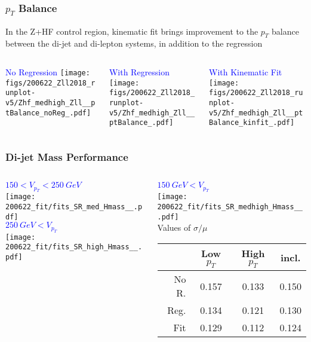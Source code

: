 \documentclass{beamer}
\begin{document}
\begin{frame}
  \frametitle{$p_T$ Balance}

  In the Z+HF control region, kinematic fit brings improvement to the $p_T$ balance
  between the di-jet and di-lepton systems,
  in addition to the regression
  \vfill

  \begin{columns}
    \begin{column}{0.33\linewidth}
      \centering
      \textcolor{blue}{No Regression}
      \texttt{[image: figs/200622\_Zll2018\_runplot-v5/Zhf\_medhigh\_Zll\_\_ptBalance\_noReg\_.pdf]}
    \end{column}
    \begin{column}{0.34\linewidth}
      \centering
      \textcolor{blue}{With Regression}
      \texttt{[image: figs/200622\_Zll2018\_runplot-v5/Zhf\_medhigh\_Zll\_\_ptBalance\_.pdf]}
    \end{column}
    \begin{column}{0.33\linewidth}
      \centering
      \textcolor{blue}{With Kinematic Fit}
      \texttt{[image: figs/200622\_Zll2018\_runplot-v5/Zhf\_medhigh\_Zll\_\_ptBalance\_kinfit\_.pdf]}
    \end{column}
  \end{columns}

\end{frame}

\begin{frame}
  \frametitle{Di-jet Mass Performance}

  \begin{columns}
    \begin{column}{0.5\linewidth}
      \centering
      \textcolor{blue}{$150 < V_{p_T} < \SI{250}{GeV}$} \\
      \texttt{[image: 200622\_fit/fits\_SR\_med\_Hmass\_\_.pdf]} \\
      \textcolor{blue}{$\SI{250}{GeV} < V_{p_T}$} \\
      \texttt{[image: 200622\_fit/fits\_SR\_high\_Hmass\_\_.pdf]}
    \end{column}
    \begin{column}{0.5\linewidth}
      \centering
      \textcolor{blue}{$\SI{150}{GeV} < V_{p_T}$} \\
      \texttt{[image: 200622\_fit/fits\_SR\_medhigh\_Hmass\_\_.pdf]} \\

      Values of $\sigma/\mu$
      {\scriptsize
      \begin{tabular}{|r|c|c|c|}
        \hline
        & Low $p_T$ & High $p_T$ & incl. \\
        \hline
        No R. & 0.157 & 0.133 & 0.150 \\
        Reg.  & 0.134 & 0.121 & 0.130 \\
        Fit   & 0.129 & 0.112 & 0.124 \\
        \hline
      \end{tabular}
      }
    \end{column}
  \end{columns}

\end{frame}
\end{document}
